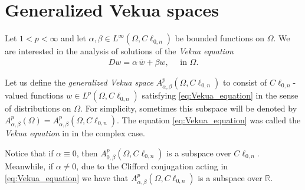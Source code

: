 \documentclass[12pt]{article}
\newcommand{\comment}[1]{\marginpar{\hfuzz=5ex
\scriptsize$\stackrel{?}{\longleftarrow}$\\\hspace*{-3ex}
{\fbox{\parbox{20ex}{\hfuzz=15ex \raggedright\sf#1 }}} }}
\newtheorem{proposition}[theorem]{Proposition}
\def\R{\mathbb{R}}
\def\tr{\operatorname{\rm tr}}
\begin{document}

\section{Generalized Vekua spaces}\label{sec:Bergman-Vekua spaces}

Let $1<p<\infty$ and let $\alpha,\beta \in L^{\infty}(\Omega,C\ell_{0,n})$ be bounded functions on $\Omega$. We are interested in the analysis of solutions of the \textit{Vekua equation}
\begin{align}\label{eq:Vekua_equation}
   D w=\alpha\, \overline{w}+\beta w, \quad \text{ in }\Omega.
\end{align}


Let us define the \textit{generalized Vekua space} $A_{\alpha,\beta}^p(\Omega,C\ell_{0,n})$ to consist of $C\ell_{0,n}$-valued functions $w \in L^p(\Omega,C\ell_{0,n})$ satisfying \eqref{eq:Vekua_equation} in the sense of distributions on $\Omega$. 
For simplicity, sometimes this subspace will be denoted by $A_{\alpha,\beta}^p(\Omega)=A_{\alpha,\beta}^p(\Omega,C\ell_{0,n})$. The equation \eqref{eq:Vekua_equation} was called the \textit{Vekua equation} in \cite{Vekua1962} in the complex case. 


Notice that if $\alpha\equiv 0$, then $A_{0,\beta}^p(\Omega,C\ell_{0,n})$ is a subspace over $C\ell_{0,n}$. Meanwhile, if $\alpha\ne 0$, due to the Clifford conjugation acting in \eqref{eq:Vekua_equation} we have that $A_{\alpha,\beta}^p(\Omega,C\ell_{0,n})$ is a subspace over $\R$. 
\end{document}
